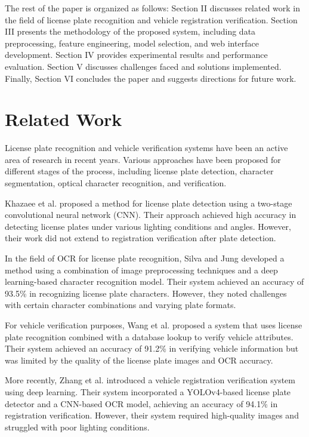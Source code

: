 \documentclass[conference]{IEEEtran}
\begin{document}
The rest of the paper is organized as follows: Section II discusses related work in the field of license plate recognition and vehicle registration verification. Section III presents the methodology of the proposed system, including data preprocessing, feature engineering, model selection, and web interface development. Section IV provides experimental results and performance evaluation. Section V discusses challenges faced and solutions implemented. Finally, Section VI concludes the paper and suggests directions for future work.

\section{Related Work}
License plate recognition and vehicle verification systems have been an active area of research in recent years. Various approaches have been proposed for different stages of the process, including license plate detection, character segmentation, optical character recognition, and verification.

Khazaee et al. \cite{khazaee2020} proposed a method for license plate detection using a two-stage convolutional neural network (CNN). Their approach achieved high accuracy in detecting license plates under various lighting conditions and angles. However, their work did not extend to registration verification after plate detection.

In the field of OCR for license plate recognition, Silva and Jung \cite{silva2018} developed a method using a combination of image preprocessing techniques and a deep learning-based character recognition model. Their system achieved an accuracy of 93.5\% in recognizing license plate characters. However, they noted challenges with certain character combinations and varying plate formats.

For vehicle verification purposes, Wang et al. \cite{wang2019} proposed a system that uses license plate recognition combined with a database lookup to verify vehicle attributes. Their system achieved an accuracy of 91.2\% in verifying vehicle information but was limited by the quality of the license plate images and OCR accuracy.

More recently, Zhang et al. \cite{zhang2021} introduced a vehicle registration verification system using deep learning. Their system incorporated a YOLOv4-based license plate detector and a CNN-based OCR model, achieving an accuracy of 94.1\% in registration verification. However, their system required high-quality images and struggled with poor lighting conditions.
\end{document}
